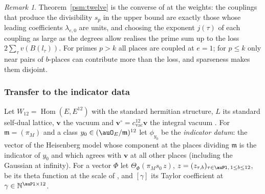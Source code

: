 \documentclass[10pt]{amsart}
\theoremstyle{definition}
\theoremstyle{remark}
\newtheorem{remark}[theorem]{Remark}
\newcommand{\N}{\mathbb N}
\providecommand{\psvac}{\mathbf v}
\begin{document}
\begin{remark}
Theorem~\ref{psm:twelve} is the converse of {\cite[Proposition~14.10]{P46}} at the weights: the
couplings that produce the divisibility $s_p$ in the upper bound are exactly those whose leading
coefficients $\lambda_{e,0}$ are units, and choosing the exponent $j(\tau)$ of each coupling as
large as the degrees allow realises the prime sum up to the loss $2\sum_\tau v(B(l_\tau))$. For
primes $p>k$ all places are coupled at $e=1$; for $p\le k$ only near pairs of $b$-places can
contribute more than the loss, and sparseness makes them disjoint.
\end{remark}

\subsubsection{Transfer to the indicator data}\label{psm:ss-attained}

Let $W_{12}=\operatorname{Hom}(E,E^{12})$ with the standard hermitian structure, $L$ its standard
self-dual lattice, $\psvac$ the vacuum and $\psvac^\circ=c_{\mathrm{vac}}^{12}\psvac$ the integral
vacuum {\cite[(58)]{P49}}. For $\mathfrak m=(\pi_M)$ and a class $y_0\in(\auO_E/\mathfrak m)^{12}$
let $\phi_{y_0}$ be the \emph{indicator datum}: the vector of the Heisenberg model whose component
at the places dividing $\mathfrak m$ is the indicator of $y_0$ and which agrees with $\psvac$ at
all other places (including the Gaussian at infinity). For a vector $\Phi$ let
$\Theta_\Phi(\pi_Ms_0\,z)$, $z=(z_{\tau,b})_{\tau\in\auPl,\,1\le b\le12}$, be its theta function
at the scale of {\cite[(45)]{P49}}, and $[\gamma]$ its Taylor coefficient at $\gamma\in
\N^{\auPl\times12}$.
\end{document}
